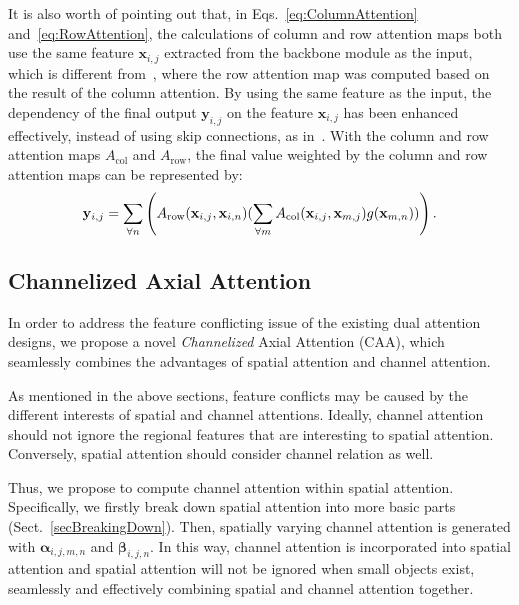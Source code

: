 \documentclass[letterpaper]{article} \usepackage{aaai22}  \usepackage{times}  \usepackage{helvet}  \usepackage{courier}  \usepackage[hyphens]{url}  \usepackage{graphicx} \urlstyle{rm} \def\UrlFont{\rm}  \usepackage{natbib}  \usepackage{caption} \DeclareCaptionStyle{ruled}{labelfont=normalfont,labelsep=colon,strut=off} \frenchspacing  \setlength{\pdfpagewidth}{8.5in}  \setlength{\pdfpageheight}{11in}  \usepackage{algorithm}
\begin{document}
It is also worth of pointing out that, in Eqs.~\eqref{eq:ColumnAttention} and~\eqref{eq:RowAttention}, the calculations of column and row attention maps both use the same feature $\mathbf{x}_{i,j}$ extracted from the backbone module as the input, which is different from~\cite{cAxialDeepLab}, where the row attention map was computed based on the result of the column attention. 
By using the same feature as the input, the dependency of the final output $\mathbf{y}_{i,j}$ on the feature $\mathbf{x}_{i,j}$ has been enhanced effectively, instead of using skip connections, as in~\cite{cAxialDeepLab}. \fi
With the column and row attention maps $A_\text{col}$ and $A_\text{row}$, the final value weighted by the column and row attention maps can be represented by: 
\begin{equation}
\scriptsize
\mathbf{y}_{i,j} = \sum_{\forall n} \left( A_\text{row}(\mathbf{x}_{i,j}, \mathbf{x}_{i,n})  (\sum_{\forall m} A_\text{col}(\mathbf{x}_{i,j}, \mathbf{x}_{m,j}) g(\mathbf{x}_{m,n})) \right).
\label{eq:SumAcrossAxialAttention}
\end{equation}


\subsection {Channelized Axial Attention}
\label{sChannelizedAttention}

In order to address the feature conflicting issue of the existing dual attention designs, we propose a novel \textit{Channelized} Axial Attention (CAA), which seamlessly combines the advantages of spatial attention and channel attention.

As mentioned in the above sections, feature conflicts may be caused by the different interests of spatial and channel attentions. 
Ideally, channel attention should not ignore the regional features that are interesting to spatial attention. 
Conversely, spatial attention should consider channel relation as well.

Thus, we propose to compute channel attention within spatial attention. Specifically, we firstly break down spatial attention into more basic parts (Sect.~\ref{secBreakingDown}). Then, spatially varying channel attention is generated with $\bm{\alpha}_{i,j,m,n}$ and $\bm{\beta}_{i,j,n}$. In this way, channel attention is incorporated into spatial attention and spatial attention will not be ignored when small objects exist, seamlessly and effectively combining spatial and channel attention together.
\end{document}
